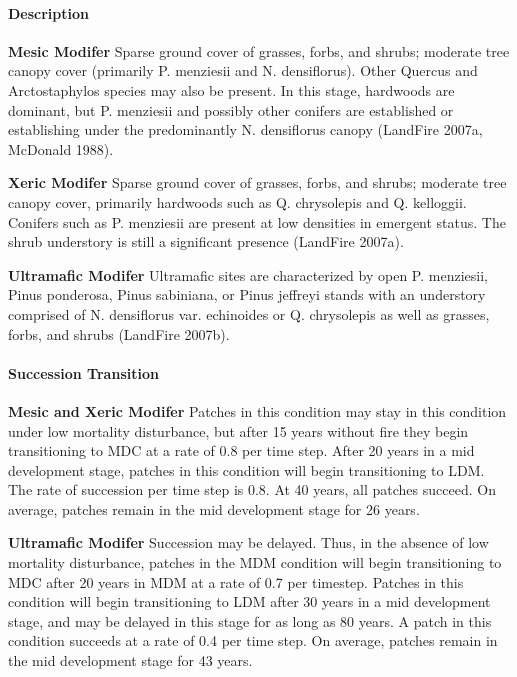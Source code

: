 \paragraph{Description}
\begin{adjustwidth}{2cm}{}
\textbf{Mesic Modifer } Sparse ground cover of grasses, forbs, and shrubs; moderate tree canopy cover (primarily P. menziesii and N. densiflorus). Other Quercus and Arctostaphylos species may also be present. In this stage, hardwoods are dominant, but P. menziesii and possibly other conifers are established or establishing under the predominantly N. densiflorus canopy (LandFire 2007a, McDonald 1988). 


\medskip
\noindent \textbf{Xeric Modifer} Sparse ground cover of grasses, forbs, and shrubs; moderate tree canopy cover, primarily hardwoods such as Q. chrysolepis and Q. kelloggii. Conifers such as P. menziesii are present at low densities in emergent status. The shrub understory is still a significant presence (LandFire 2007a). 


\medskip
\noindent \textbf{Ultramafic Modifer}  Ultramafic sites are characterized by open P. menziesii, Pinus ponderosa, Pinus sabiniana, or Pinus jeffreyi stands with an understory comprised of N. densiflorus var. echinoides or Q. chrysolepis as well as grasses, forbs, and shrubs (LandFire 2007b).

\end{adjustwidth}
\paragraph{Succession Transition}
\begin{adjustwidth}{2cm}{}
\textbf{Mesic and Xeric Modifer } Patches in this condition may stay in this condition under low mortality disturbance, but after 15 years without fire they begin transitioning to MDC at a rate of 0.8 per time step. After 20 years in a mid development stage, patches in this condition will begin transitioning to LDM. The rate of succession per time step is 0.8. At 40 years, all patches succeed. On average, patches remain in the mid development stage for 26 years.


\medskip
\noindent \textbf{Ultramafic Modifer} Succession may be delayed. Thus, in the absence of low mortality disturbance, patches in the MDM condition will begin transitioning to MDC after 20 years in MDM at a rate of 0.7 per timestep. Patches in this condition will begin transitioning to LDM after 30 years in a mid development stage, and may be delayed in this stage for as long as 80 years. A patch in this condition succeeds at a rate of 0.4 per time step. On average, patches remain in the mid development stage for 43 years.

\end{adjustwidth}
